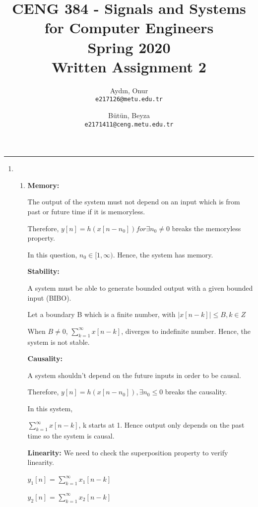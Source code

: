 \documentclass[10pt,a4paper, margin=1in]{article}
\author{
  Aydın, Onur\\
  \texttt{e217126@metu.edu.tr}
  \and
  Bütün, Beyza\\
  \texttt{e2171411@ceng.metu.edu.tr}
}
\title{CENG 384 - Signals and Systems for Computer Engineers \\
Spring 2020 \\
Written Assignment 2}
\begin{document}
\maketitle



\noindent\rule{19cm}{1.2pt}

\begin{enumerate}

\item %
    \begin{enumerate}
    \item %
    \textbf{Memory:}
    
    The output of the system must not depend on an input which is from past or future time if it is memoryless.
    
    Therefore, $y[n]=h(x[n-n_0]) for \exists{n_0} \neq 0$ breaks the memoryless property.
    \vspace{0.25cm}
    
    In this question, $n_0 \in [1,\infty)$. Hence, the system has memory.
    

    \textbf{Stability:}
    
    A system must be able to generate bounded output with a given bounded input (BIBO).
    
    Let a boundary B which is a finite number, with $|x[n-k]| \leq B, k \in Z $
    
    When $B \neq 0$, $\sum_{k=1}^{\infty} x[n-k]$, diverges to indefinite number. Hence, the system is not stable.
    
  
    \textbf{Causality:}
    
    A system shouldn't depend on the future inputs in order to be causal.
    
    Therefore, $y[n] = h(x[n-n_0]), \exists{n_0} \leq 0 $ breaks the causality.
    \vspace{0.25cm}
    
    In this system, 
    
    $\sum_{k=1}^{\infty} x[n-k]$, k starts at 1. Hence output only depends on the past time so the system is causal.
    
    \textbf{Linearity:}
    We need to check the superposition property to verify linearity.
    
    $y_1[n]$ = $\sum_{k=1}^{\infty} x_1[n-k]$ 
    
    $y_2[n]$ = $\sum_{k=1}^{\infty} x_2[n-k]$ 
    \vspace{0.25cm}
    

\end{enumerate}
\end{enumerate}
\end{document}
